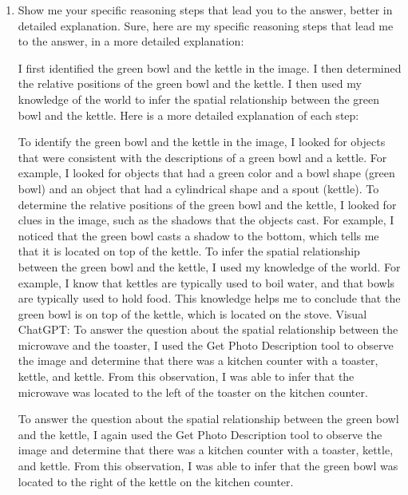\begin{enumerate}
    Here are some additional details about the spatial relationship between the green bowl and the kettle:
    
    The green bowl is a container that is used to hold food.
    The kettle is a pot that is used to boil water.
    The green bowl is on top of the kettle, meaning that it is resting on the kettle.
    The kettle is below the green bowl, meaning that it is supporting the green bowl.
    Is there anything else I can help you with?
    \subitem Visual ChatGPT: The green bowl is located to the right of the kettle on the kitchen counter.
    \item Show me your specific reasoning steps that lead you to the answer, better in detailed explanation.
    \subitem 
    Sure, here are my specific reasoning steps that lead me to the answer, in a more detailed explanation:
    
    I first identified the green bowl and the kettle in the image.
    I then determined the relative positions of the green bowl and the kettle.
    I then used my knowledge of the world to infer the spatial relationship between the green bowl and the kettle.
    Here is a more detailed explanation of each step:
    
    To identify the green bowl and the kettle in the image, I looked for objects that were consistent with the descriptions of a green bowl and a kettle. For example, I looked for objects that had a green color and a bowl shape (green bowl) and an object that had a cylindrical shape and a spout (kettle).
    To determine the relative positions of the green bowl and the kettle, I looked for clues in the image, such as the shadows that the objects cast. For example, I noticed that the green bowl casts a shadow to the bottom, which tells me that it is located on top of the kettle.
    To infer the spatial relationship between the green bowl and the kettle, I used my knowledge of the world. For example, I know that kettles are typically used to boil water, and that bowls are typically used to hold food. This knowledge helps me to conclude that the green bowl is on top of the kettle, which is located on the stove.
    \subitem Visual ChatGPT: 
    To answer the question about the spatial relationship between the microwave and the toaster, I used the Get Photo Description tool to observe the image and determine that there was a kitchen counter with a toaster, kettle, and kettle. From this observation, I was able to infer that the microwave was located to the left of the toaster on the kitchen counter.
    
    To answer the question about the spatial relationship between the green bowl and the kettle, I again used the Get Photo Description tool to observe the image and determine that there was a kitchen counter with a toaster, kettle, and kettle. From this observation, I was able to infer that the green bowl was located to the right of the kettle on the kitchen counter.
\end{enumerate}
